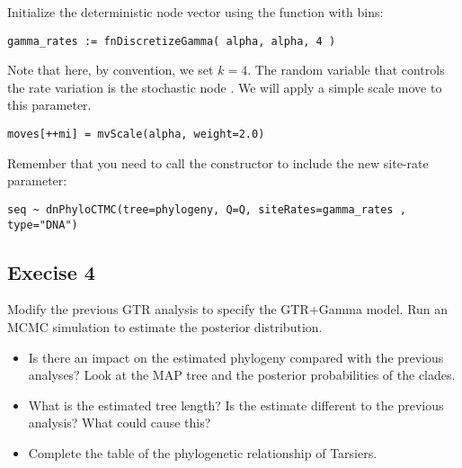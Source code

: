 Initialize the  deterministic node vector using the   function with  bins:
{\tt \begin{snugshade*}
\begin{lstlisting}
gamma_rates := fnDiscretizeGamma( alpha, alpha, 4 )
\end{lstlisting}
\end{snugshade*}}

Note that here, by convention, we set $k = 4$.
The random variable that controls the rate variation is the stochastic node . 
We will apply a simple scale move to this parameter.
{\tt \begin{snugshade*}
\begin{lstlisting}
moves[++mi] = mvScale(alpha, weight=2.0)
\end{lstlisting}
\end{snugshade*}}

Remember that you need to call the  constructor to include the new site-rate parameter:
{\tt \begin{snugshade*}
\begin{lstlisting}
seq ~ dnPhyloCTMC(tree=phylogeny, Q=Q, siteRates=gamma_rates , type="DNA")
\end{lstlisting}
\end{snugshade*}}


\subsection{Execise 4}

Modify the previous GTR analysis to specify the GTR+Gamma model. 
Run an MCMC simulation to estimate the posterior distribution.
\begin{itemize}
\item Is there an impact on the estimated phylogeny compared with the previous analyses? 
	Look at the MAP tree and the posterior probabilities of the clades.
\item What is the estimated tree length? 
	Is the estimate different to the previous analysis? What could cause this?
\item Complete the table of the phylogenetic relationship of Tarsiers.
\end{itemize}



